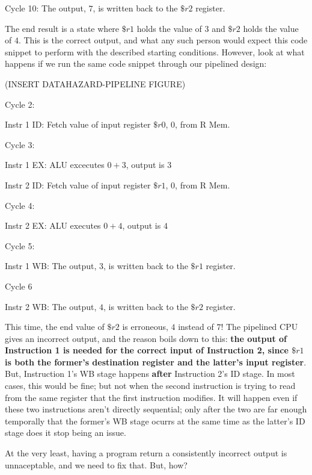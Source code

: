 \documentclass[12pt,twoside]{reedthesis}
\begin{document}
Cycle 10: The output, $7$, is written back to the $\$r2$ register.

\vspace{5mm}

The end result is a state where $\$r1$ holds the value of $3$ and $\$r2$ holds the value of $4$. This is the correct output, and what any such person would expect this code snippet to perform with the described starting conditions. However, look at what happens if we run the same code snippet through our pipelined design:

(INSERT DATAHAZARD-PIPELINE FIGURE)

Cycle 2:

\qquad Instr 1 ID:  Fetch value of input register $\$r0$, $0$, from R Mem.

Cycle 3:

\qquad Instr 1 EX: ALU excecutes $0 + 3$, output is $3$

\qquad Instr 2 ID: Fetch value of input register $\$r1$, $0$, from R Mem.

Cycle 4:

\qquad Instr 2 EX: ALU executes $0 + 4$, output is $4$

Cycle 5:

\qquad Instr 1 WB: The output, $3$, is written back to the $\$r1$ register.

Cycle 6

\qquad Instr 2 WB: The output, $4$, is written back to the $\$r2$ register.

\vspace{5mm}

This time, the end value of $\$r2$ is erroneous, $4$ instead of $7$! The pipelined CPU gives an incorrect output, and the reason boils down to this: \textbf{the output of Instruction 1 is needed for the correct input of Instruction 2, since $\$r1$ is both the former's destination register and the latter's input register}. But, Instruction 1's WB stage happens \textbf{after} Instruction 2's ID stage. In most cases, this would be fine; but not when the second instruction is trying to read from the same register that the first instruction modifies. It will happen even if these two instructions aren't directly sequential; only after the two are far enough temporally that the former's WB stage ocurrs at the same time as the latter's ID stage does it stop being an issue.

At the very least, having a program return a consistently incorrect output is unnaceptable, and we need to fix that. But, how?
\end{document}
